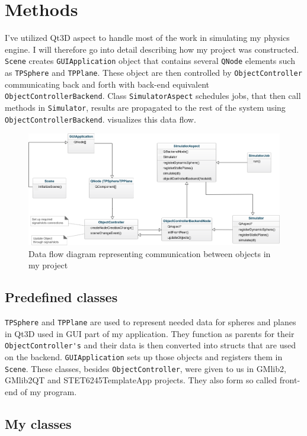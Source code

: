 \documentclass[a4,10pt]{article}
\begin{document}
\section{Methods}
I've utilized Qt3D aspect to handle most of the work in simulating my physics engine. I will therefore go into detail describing how my project was constructed. \verb|Scene| creates \verb|GUIApplication| object that contains several \verb|QNode| elements such as \verb|TPSphere| and \verb|TPPlane|. These object are then controlled by \verb|ObjectController| communicating back and forth with back-end equivalent \verb|ObjectControllerBackend|. Class \verb|SimulatorAspect| schedules jobs, that then call methods in \verb|Simulator|, results are propagated to the rest of the system using \verb|ObjectControllerBackend|.  visualizes this data flow.
\begin{figure}[H]
  \centering
  \includegraphics[width=\textwidth]{DataFlow}
  \caption{Data flow diagram representing communication between objects in my project} \label{DataFlow}
\end{figure}

\subsection{Predefined classes}
\verb|TPSphere| and \verb|TPPlane| are used to represent needed data for spheres and planes in Qt3D used in GUI part of my application. They function as parents for their \verb|ObjectController's| and their data is then converted into structs that are used on the backend. \verb|GUIApplication| sets up those objects and registers them in \verb|Scene|. These classes, besides \verb|ObjectController|, were given to us in GMlib2, GMlib2QT and STET6245TemplateApp projects. They also form so called front-end of my program.

\subsection{My classes}
\end{document}
